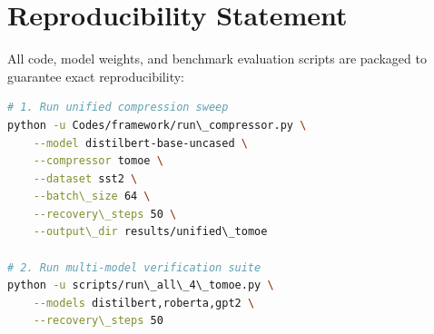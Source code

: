 \section{Reproducibility Statement}
All code, model weights, and benchmark evaluation scripts are packaged to guarantee exact reproducibility:
\begin{lstlisting}[language=bash]
# 1. Run unified compression sweep
python -u Codes/framework/run\_compressor.py \
    --model distilbert-base-uncased \
    --compressor tomoe \
    --dataset sst2 \
    --batch\_size 64 \
    --recovery\_steps 50 \
    --output\_dir results/unified\_tomoe

# 2. Run multi-model verification suite
python -u scripts/run\_all\_4\_tomoe.py \
    --models distilbert,roberta,gpt2 \
    --recovery\_steps 50
\end{lstlisting}
